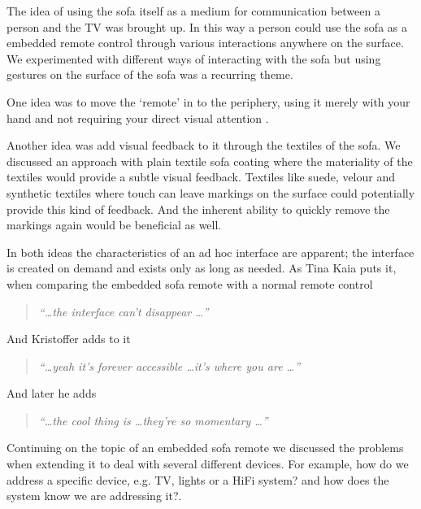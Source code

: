
The idea of using the sofa itself as a medium for communication between a person and the TV was brought up.
In this way a person could use the sofa as a embedded remote control through various interactions anywhere on the surface.
We experimented with different ways of interacting with the sofa but using gestures on the surface of the sofa was a recurring theme.

One idea was to move the `remote' in to the periphery, using it merely with your hand and not requiring your direct visual attention .

Another idea was add visual feedback to it through the textiles of the sofa.
We discussed an approach with plain textile sofa coating where the materiality of the textiles would provide a subtle visual feedback.
Textiles like suede, velour and synthetic textiles where touch can leave markings on the surface could potentially provide this kind of feedback.
And the inherent ability to quickly remove the markings again would be beneficial as well.

In both ideas the characteristics of an ad hoc interface are apparent; the interface is created on demand and exists only as long as needed.
As Tina Kaia puts it, when comparing the embedded sofa remote with a normal remote control

\begin{quotation}
  \emph{``\dots the interface can't disappear \dots''}
\end{quotation}
And Kristoffer adds to it
\begin{quotation}
  \emph{``\dots yeah it's forever accessible \dots it's where you are \dots''}
\end{quotation}
And later he adds
\begin{quotation}
  \emph{``\dots the cool thing is \dots they're so momentary \dots''}
\end{quotation}

Continuing on the topic of an embedded sofa remote we discussed the problems when extending it to deal with several different devices.
For example, how do we address a specific device, e.g. TV, lights or a HiFi system? and how does the system know we are addressing it?.
\blank

